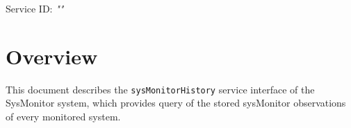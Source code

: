 \documentclass[a4paper]{arrowhead}
\begin{document}
\sloppy

\ArrowheadSetup

\begin{center}
  \vspace*{1cm}
  \huge{\arrowtitle}

  \vspace*{0.2cm}
  \LARGE{\arrowtype}
  \vspace*{1cm}

  \Large{Service ID: \textit{"\arrowid"}}

  \vspace*{\fill}


  \vspace*{1cm}
  \vspace*{\fill}

  \begin{abstract}
    This document describes the HTTP/1.1 protocol with TLS payload security and JSON payload encoding variant of the \texttt{sysMonitorHistory} service of the SysMonitor system.
  \end{abstract}

  \vspace*{1cm}
\end{center}

\newpage

\tableofcontents
\newpage

\section{Overview}
\label{sec:overview}

This document describes the \texttt{sysMonitorHistory} service interface of the SysMonitor system, which provides query of the stored sysMonitor observations of every monitored system.
\end{document}
